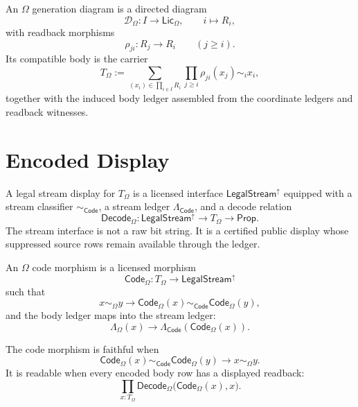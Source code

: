 \begin{definition}
\label{def:omega-generation-diagram}
An $\Omega$ generation diagram is a directed diagram
$$
\mathcal D_{\Omega}:I\to\mathsf{Lic}_{\Omega},
\qquad
i\mapsto R_i,
$$
with readback morphisms
$$
\rho_{ji}:R_j\to R_i
\qquad(j\ge i).
$$
Its compatible body is the carrier
$$
T_{\Omega}:=
\sum_{(x_i)\in\prod_{i\in I}R_i}
\prod_{j\ge i}\rho_{ji}(x_j)\sim_i x_i,
$$
together with the induced body ledger assembled from the coordinate
ledgers and readback witnesses.
\end{definition}

\section{Encoded Display}
\label{sec:omega-generation-encoded-display}

\begin{definition}
\label{def:omega-generation-legal-stream-display}
A legal stream display for $T_{\Omega}$ is a licensed interface
$\mathsf{LegalStream}^{\uparrow}$ equipped with a stream classifier
$\sim_{\mathsf{Code}}$, a stream ledger $\Lambda_{\mathsf{Code}}$, and a
decode relation
$$
\mathsf{Decode}_{\Omega}:
\mathsf{LegalStream}^{\uparrow}\to T_{\Omega}\to\mathsf{Prop}.
$$
The stream interface is not a raw bit string. It is a certified public
display whose suppressed source rows remain available through the ledger.
\end{definition}

\begin{definition}
\label{def:omega-generation-code-morphism}
An $\Omega$ code morphism is a licensed morphism
$$
\mathsf{Code}_{\Omega}:T_{\Omega}\to
\mathsf{LegalStream}^{\uparrow}
$$
such that
$$
x\sim_{\Omega}y
\to
\mathsf{Code}_{\Omega}(x)
\sim_{\mathsf{Code}}
\mathsf{Code}_{\Omega}(y),
$$
and the body ledger maps into the stream ledger:
$$
\Lambda_{\Omega}(x)
\to
\Lambda_{\mathsf{Code}}(\mathsf{Code}_{\Omega}(x)).
$$
\end{definition}

\begin{definition}
\label{def:omega-generation-faithful-readable-code}
The code morphism is faithful when
$$
\mathsf{Code}_{\Omega}(x)
\sim_{\mathsf{Code}}
\mathsf{Code}_{\Omega}(y)
\to
x\sim_{\Omega}y.
$$
It is readable when every encoded body row has a displayed readback:
$$
\prod_{x:T_{\Omega}}
\mathsf{Decode}_{\Omega}
\bigl(\mathsf{Code}_{\Omega}(x),x\bigr).
$$
\end{definition}


